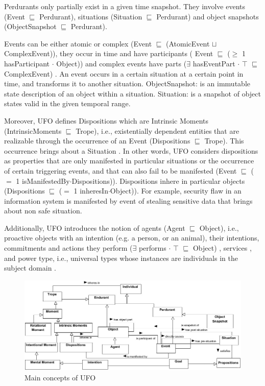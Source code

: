 \documentclass[sw]{iosart2x}
\newcommand{\CONSIDER}[1]{{\color{blue}{\textbf{CONSIDER: {#1}}\xspace}}}
\newcommand{\term}[1]{\textnormal{\textsf{#1}}}
\begin{document}
Perdurants only partially exist in a given time snapshot. They involve events (\term{Event} $ \sqsubseteq $  \term{Perdurant}), situations (\term{Situation} $ \sqsubseteq $  \term{Perdurant}) and object snapshots (\term{ObjectSnapshot} $ \sqsubseteq $  \term{Perdurant}). 

Events can be either atomic or complex (\term{Event} $ \sqsubseteq $  (\term{AtomicEvent} $ \sqcup $ \term{ComplexEvent})), they occur in time and have participants ( \term{Event} $ \sqsubseteq $ ($\ge$ 1  \term{hasParticipant} $\cdot$ \term{Object})) and complex events have parts ($\exists$ \term{hasEventPart} $\cdot$ $\top$ $\sqsubseteq$ \term{ComplexEvent}) \cite{Guizzardi2013}. An event occurs in a certain \term {situation} at a certain point in time, and transforms it to another situation. ObjectSnapshot: is an immutable state description of an object within a situation. Situation: is a snapshot of object states valid in the given temporal range.

Moreover, UFO defines Dispositions which are Intrinsic Moments (\term{IntrinsicMoments} $ \sqsubseteq $  \term{Trope}), i.e., existentially dependent entities that are realizable through
the occurrence of an Event  (\term{Dispositions} $ \sqsubseteq $  \term{Trope}). This occurrence brings about a Situation \cite{Guizzardi2014}. In other words, UFO considers dispositions as properties that are only manifested in particular situations or the occurrence of certain triggering events, and that can also fail to be manifested (\term{Event} $ \sqsubseteq $  ($ = $ 1 \term{isManifestedBy}$\cdot$\term{Dispositions})). Dispositions inhere in particular objects (\term{Dispositions} $ \sqsubseteq $  ($ = $ 1 \term{inheresIn}$\cdot$\term{Object})). For example, security flaw in an information system is manifested by event of stealing sensitive data that brings about non safe situation.

Additionally, UFO introduces the notion of agents (\term{Agent} $ \sqsubseteq $  \term{Object}), i.e., proactive objects with an intention (e.g. a person, or an animal), their intentions, commitments and actions they perform ($\exists$ \term{performs} $\cdot$ $\top$ $\sqsubseteq$ \term{Object}) \cite{Guizzardi:2004:TOF:2156041.2156051}, services \cite{unknown1}, and power type, i.e., universal types 
whose instances are individuals in the subject domain \cite{CARVALHO20173, gagc2015toap}.


\begin{figure}
\begin{center}
\includegraphics[width=\textwidth]{ufod}
\end{center}
\caption{Main concepts of UFO}
\label{fig:fu}
\end{figure}
\end{document}
